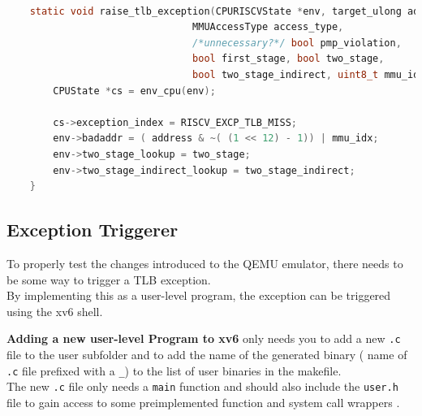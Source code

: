 \begin{lstlisting}[language=c,float=h!,
    caption={Setup-Code for raising a TLB Exception. The \texttt{cs-\textgreater exception\_index} variable needs
    to be set to the custom \texttt{TLB Exception} enum value. The \texttt{env-\textgreater badaddr} variable
    will end up in the \texttt{mtval} register. The address will be page-aligned first, by zeroing out the
    lowest 12 bits. This is used to encode the \texttt{mmu\_idx} into the faulting address. Why this is
    necessary is explained in Section \ref{sect:tlbwrite}},
    label={lst:exceptionThrow}]

    static void raise_tlb_exception(CPURISCVState *env, target_ulong address,
                                MMUAccessType access_type,
                                /*unnecessary?*/ bool pmp_violation,
                                bool first_stage, bool two_stage,
                                bool two_stage_indirect, uint8_t mmu_idx) {
        CPUState *cs = env_cpu(env);

        cs->exception_index = RISCV_EXCP_TLB_MISS;
        env->badaddr = ( address & ~( (1 << 12) - 1)) | mmu_idx;
        env->two_stage_lookup = two_stage;
        env->two_stage_indirect_lookup = two_stage_indirect;
    }

\end{lstlisting}



\subsection{Exception Triggerer}
To properly test the changes introduced to the QEMU emulator, there needs to be some way to
trigger a TLB exception.\\
By implementing this as a user-level program, the exception can be triggered using the xv6 shell.

\textbf{Adding a new user-level Program to xv6} only needs you to add a new \texttt{.c} file to the user subfolder
and to add the name of the generated binary ( name of \texttt{.c} file prefixed with a \texttt{\_})
to the list of user binaries in the makefile.\\
The new \texttt{.c} file only needs a \texttt{main} function and should also include the \texttt{user.h}
file to gain access to some preimplemented function and system call wrappers \cite{xv6source}.

